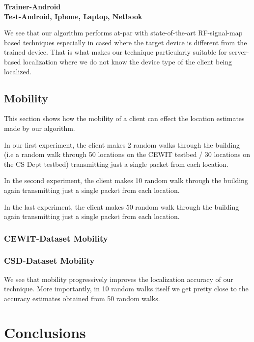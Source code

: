 \documentclass{Localization-PaperWriteupDraft}
\begin{document}
{\bf {Trainer-Android \\
	Test-Android, Iphone, Laptop, Netbook}}


We see that our algorithm performs at-par with state-of-the-art
RF-signal-map based techniques especially in cased where the target
device is different from the trained device. That is what makes our
technique particularly suitable for server-based localization where we
do not know the device type of the client being localized.

\subsection{Mobility}
\label{subsec:mobility}

This section shows how the mobility of a client can effect the location
estimates made by our algorithm.

In our first experiment, the client makes 2 random walks through the
building (i.e a random walk through 50 locations on the CEWIT testbed /
30 locations on the CS Dept testbed) transmitting just a single packet from each
location.

In the second experiment, the client makes 10 random walk through the
building again transmitting just a single packet from each location. 

In the last experiment, the client makes 50 random walk through the 
building again transmitting just a single packet from each location. 

\subsubsection{CEWIT-Dataset Mobility}
\label{subsubsec:cewitdatasetmobility}


\subsubsection{CSD-Dataset Mobility}
\label{subsubsec:csddatasetmobility}


We see that mobility progressively improves the localization accuracy of
our technique. More importantly, in 10 random walks itself we get pretty close
to the accuracy estimates obtained from 50 random walks. 

\section{Conclusions}
\label{sec:conclusions}
\end{document}

